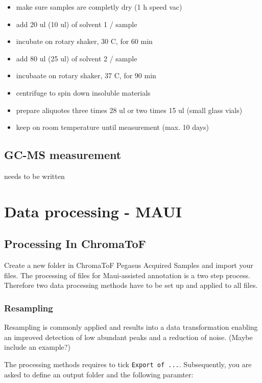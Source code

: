 \documentclass[]{book}
\providecommand{\tightlist}{%
  \setlength{\itemsep}{0pt}\setlength{\parskip}{0pt}}
\begin{document}
\begin{itemize}
\tightlist
\item
  make sure samples are completly dry (1 h speed vac)
\item
  add 20 ul (10 ul) of solvent 1 / sample
\item
  incubate on rotary shaker, 30 C, for 60 min
\item
  add 80 ul (25 ul) of solvent 2 / sample
\item
  incubaate on rotary shaker, 37 C, for 90 min
\item
  centrifuge to spin down insoluble materials
\item
  prepare aliquotes three times 28 ul or two times 15 ul (small glass
  vials)
\item
  keep on room temperature until measurement (max. 10 days)
\end{itemize}

\section{GC-MS measurement}\label{gc-ms-measurement}

needs to be written

\chapter{Data processing - MAUI}\label{mauiproc}

\section{Processing In ChromaToF}\label{processing-in-chromatof}

Create a new folder in ChromaToF Pegasus Acquired Samples and import
your files. The processing of files for Maui-assisted annotation is a
two step process. Therefore two data processing methods have to be set
up and applied to all files.

\subsection{Resampling}\label{resampling}

Resampling is commonly applied and results into a data transformation
enabling an improved detection of low abundant peaks and a reduction of
noise. (Maybe include an example?)

The processing methods requires to tick \texttt{Export\ of\ ...}.
Subsequently, you are asked to define an output folder and the following
paramter:
\end{document}
